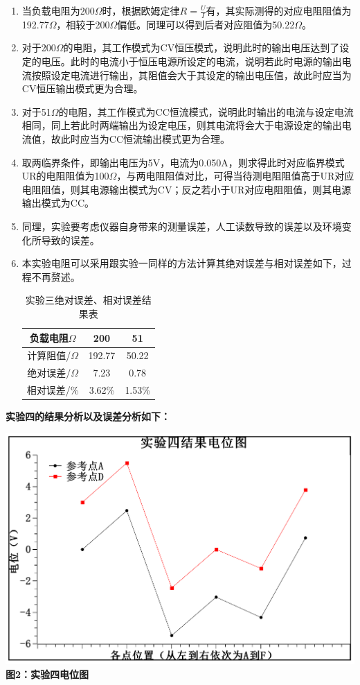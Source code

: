 \documentclass[a4paper]{article}
\begin{document}
\begin{enumerate}
    \item 当负载电阻为200$\Omega $时，根据欧姆定律$R=\frac{U}{I} $有，其实际测得的对应电阻阻值为192.77$\Omega $，相较于200$\Omega $偏低。同理可以得到后者对应阻值为50.22$\Omega $。
    \item 对于200$\Omega $的电阻，其工作模式为CV恒压模式，说明此时的输出电压达到了设定的电压。此时的电流小于恒压电源所设定的电流，说明若此时电源的输出电流按照设定电流进行输出，其阻值会大于其设定的输出电压值，故此时应当为CV恒压输出模式更为合理。
    \item 对于51$\Omega $的电阻，其工作模式为CC恒流模式，说明此时输出的电流与设定电流相同，同上若此时两端输出为设定电压，则其电流将会大于电源设定的输出电流值，故此时应当为CC恒流输出模式更为合理。
    \item 取两临界条件，即输出电压为5V，电流为0.050A，则求得此时对应临界模式UR的电阻阻值为100$\Omega $，与两电阻阻值对比，可得当待测电阻阻值高于UR对应电阻阻值，则其电源输出模式为CV；反之若小于UR对应电阻阻值，则其电源输出模式为CC。
    \item 同理，实验要考虑仪器自身带来的测量误差，人工读数导致的误差以及环境变化所导致的误差。
    \item 本实验电阻可以采用跟实验一同样的方法计算其绝对误差与相对误差如下，过程不再赘述。
    \begin{table}[!ht]
        \caption{实验三绝对误差、相对误差结果表}\label{tab:exp4}
        \begin{tabularx}{\textwidth}{*{3}{C}} \toprule
            负载电阻$\Omega $ & 200 & 51 \\ \midrule
            计算阻值/$\Omega $ & 192.77 & 50.22 \\  绝对误差/$\Omega $ & 7.23 & 0.78 \\  相对误差/\% & 3.62\% & 1.53\% \\ 
            \bottomrule
        \end{tabularx}
    \end{table}
\end{enumerate}
\par
{\songti{}\bfseries 实验四的结果分析以及误差分析如下：}\par
\begin{center}
    \includegraphics[width=\textwidth-40mm]{2.pdf}\\
    \bfseries{}\songti 图2：实验四电位图
\end{center}
\end{document}
